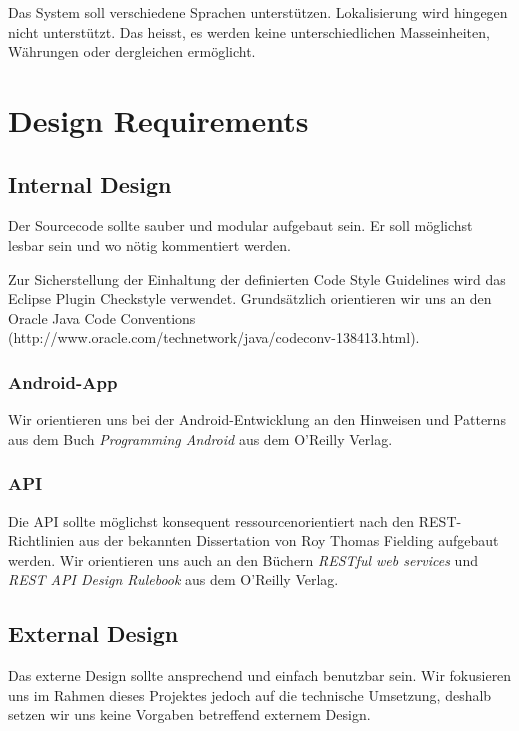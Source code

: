 \documentclass[10pt,a4paper]{scrartcl}
\begin{document}
	Das System soll verschiedene Sprachen unterstützen. Lokalisierung wird hingegen nicht unterstützt. Das heisst, es werden keine unterschiedlichen Masseinheiten, Währungen oder dergleichen ermöglicht.


\section{Design Requirements}

	\subsection{Internal Design}

	Der Sourcecode sollte sauber und modular aufgebaut sein. Er soll möglichst lesbar sein und wo nötig kommentiert werden.

	Zur Sicherstellung der Einhaltung der definierten Code Style Guidelines wird das Eclipse Plugin
	Checkstyle verwendet. Grundsätzlich orientieren wir uns an den Oracle Java Code Conventions
	(http://www.oracle.com/technetwork/java/codeconv-138413.html).

		\subsubsection{Android-App}

		Wir orientieren uns bei der Android-Entwicklung an den Hinweisen und Patterns aus dem Buch \textit{Programming Android}\cite{mednieks2012programming} aus dem O'Reilly Verlag.

		\subsubsection{API}

		Die API sollte möglichst konsequent ressourcenorientiert nach den REST-Richtlinien aus der bekannten Dissertation von Roy Thomas Fielding\cite{Fielding:2000:ASD:932295} aufgebaut werden. Wir orientieren uns auch an den Büchern \textit{RESTful web services}\cite{richardson2007restful} und \textit{REST API Design Rulebook}\cite{masse2011rest} aus dem O'Reilly Verlag.

	\subsection{External Design}

	Das externe Design sollte ansprechend und einfach benutzbar sein. Wir fokusieren uns im Rahmen dieses Projektes jedoch auf die technische Umsetzung, deshalb setzen wir uns keine Vorgaben betreffend externem Design.
\end{document}
